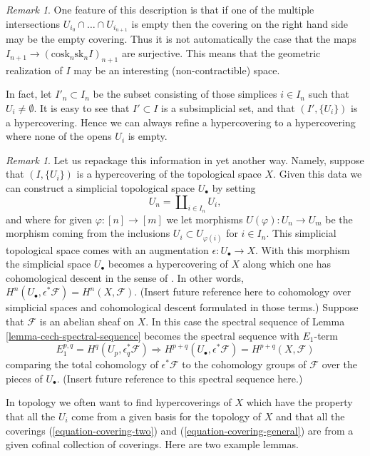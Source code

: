 \documentclass[10pt,a4paper]{article}
\theoremstyle{plain}
\theoremstyle{definition}
\theoremstyle{remark}
\newtheorem{remark}[subsection]{Remark}
\numberwithin{equation}{subsection}
\begin{document}
\begin{remark}
\label{remark-not-covering-set}
One feature of this description is that if one of the multiple
intersections $U_{i_0} \cap \ldots \cap U_{i_{n + 1}}$ is empty then
the covering on the right hand side may be the empty covering.
Thus it is not automatically the case that the maps
$I_{n + 1} \to (\text{cosk}_n\text{sk}_n I)_{n + 1}$ are surjective.
This means that the geometric realization of $I$ may be an interesting
(non-contractible) space.

\medskip\noindent
In fact, let $I'_n \subset I_n$ be the subset
consisting of those simplices $i \in I_n$ such that
$U_i \not = \emptyset$. It is easy to see that $I' \subset I$
is a subsimplicial set, and that $(I', \{U_i\})$ is a hypercovering.
Hence we can always refine a hypercovering to a hypercovering where
none of the opens $U_i$ is empty.
\end{remark}

\begin{remark}
\label{remark-repackage-into-simplicial-space}
Let us repackage this information in yet another way.
Namely, suppose that $(I, \{U_i\})$ is a hypercovering of
the topological space $X$. Given this data we can construct
a simplicial topological space $U_\bullet$ by setting
$$
U_n = \coprod\nolimits_{i \in I_n} U_i,
$$
and where for given $\varphi : [n] \to [m]$ we let
morphisms $U(\varphi) : U_n \to U_m$ be the morphism
coming from the inclusions $U_i \subset U_{\varphi(i)}$
for $i \in I_n$. This simplicial topological space comes
with an augmentation $\epsilon : U_\bullet \to X$.
With this morphism the simplicial space $U_\bullet$ becomes
a hypercovering of $X$ along which one has cohomological descent
in the sense of \cite[Expos\'e Vbis]{SGA4}.
In other words, $H^n(U_\bullet, \epsilon^*\mathcal{F}) = H^n(X, \mathcal{F})$.
(Insert future reference here to cohomology over simplicial
spaces and cohomological descent formulated in those terms.)
Suppose that $\mathcal{F}$ is an abelian sheaf on $X$.
In this case the spectral sequence of Lemma \ref{lemma-cech-spectral-sequence}
becomes the spectral sequence with $E_1$-term
$$
E_1^{p, q} = H^q(U_p, \epsilon_q^*\mathcal{F})
\Rightarrow
H^{p + q}(U_\bullet, \epsilon^*\mathcal{F}) = H^{p + q}(X, \mathcal{F})
$$
comparing the total cohomology of $\epsilon^*\mathcal{F}$
to the cohomology groups of $\mathcal{F}$ over the pieces
of $U_\bullet$. (Insert future reference to this spectral sequence
here.)
\end{remark}

\noindent
In topology we often want to find hypercoverings of $X$ which
have the property that all the $U_i$ come from a given basis for the topology
of $X$ and that all the coverings
(\ref{equation-covering-two}) and (\ref{equation-covering-general})
are from a given cofinal collection of coverings.
Here are two example lemmas.
\end{document}
